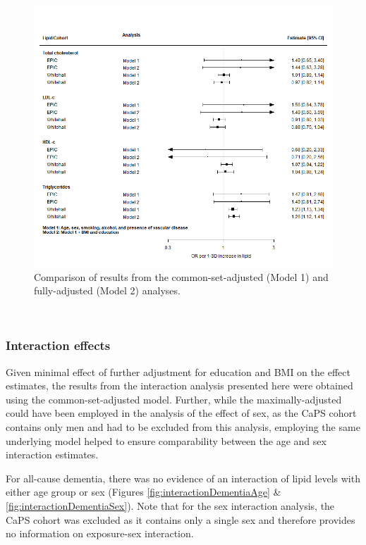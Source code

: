 \documentclass[a4paper, twoside]{templates/ociamthesis}
\begin{document}
\begin{figure}[H]
\includegraphics[width=1\linewidth]{figures/ipd/main_model_comparison} \caption[Comparison of partially and maximally adjusted results]{Comparison of results from the common-set-adjusted (Model 1) and fully-adjusted (Model 2) analyses.}\label{fig:ipdModelComparison}
\end{figure}

~

\hypertarget{interaction-effects}{%
\subsubsection{Interaction effects}\label{interaction-effects}}

Given minimal effect of further adjustment for education and BMI on the effect estimates, the results from the interaction analysis presented here were obtained using the common-set-adjusted model. Further, while the maximally-adjusted could have been employed in the analysis of the effect of sex, as the CaPS cohort contains only men and had to be excluded from this analysis, employing the same underlying model helped to ensure comparability between the age and sex interaction estimates.

For all-cause dementia, there was no evidence of an interaction of lipid levels with either age group or sex (Figures \ref{fig:interactionDementiaAge} \& \ref{fig:interactionDementiaSex}). Note that for the sex interaction analysis, the CaPS cohort was excluded as it contains only a single sex and therefore provides no information on exposure-sex interaction.
\end{document}
